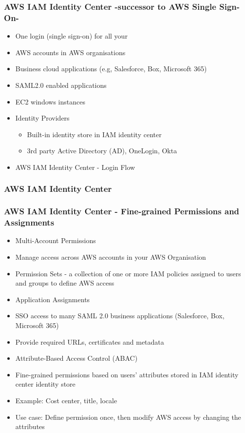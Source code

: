 \subsubsection{AWS IAM Identity Center -successor to AWS Single Sign-On- }

\begin{itemize}
    \item One login (single sign-on) for all your
    \item AWS accounts in AWS organisations
    \item Business cloud applications (e.g, Salesforce, Box, Microsoft 365)
    \item SAML2.0 enabled applications
    \item EC2 windows instances

    \item Identity Providers
    \begin{itemize}
        \item Built-in identity store in IAM identity center
        \item 3rd party Active Directory (AD), OneLogin, Okta
    \end{itemize}

    \item AWS IAM Identity Center - Login Flow
\end{itemize}

\subsubsection{AWS IAM Identity Center}

\subsubsection{AWS IAM Identity Center - Fine-grained Permissions and Assignments}
\begin{itemize}
    \item Multi-Account Permissions
    \item Manage access across AWS accounts in your AWS Organisation
    \item Permission Sets - a collection of one or more IAM policies assigned to users and groups to define AWS access
    \item Application Assignments
    \item SSO access to many SAML 2.0 business applications (Salesforce, Box, Microsoft 365)
    \item Provide required URLs, certificates and metadata
    \item Attribute-Based Access Control (ABAC)
    \item Fine-grained permissions based on users' attributes stored in IAM identity center identity store
    \item Example: Cost center, title, locale
    \item Use case: Define permission once, then modify AWS access by changing the attributes
\end{itemize}

